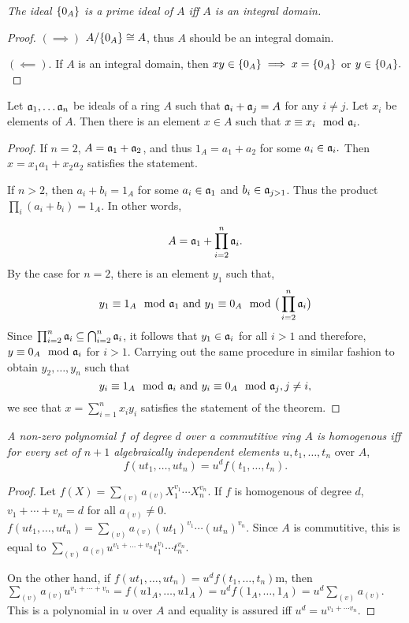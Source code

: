 \noindent \textit{The ideal $\{0_A\}$ is a prime ideal of $A$ iff $A$ is an integral domain.}
\begin{proof}
    $(\implies )$ $A/\{0_A\} \cong A$, thus $A$ should be an integral domain.

    $(\impliedby)$. If $A$ is an integral domain, then $xy \in  \{0_A\} \implies x = \{0_A\}$ or $y \in \{0_A\}.$
\end{proof}

\begin{theorem}
    Let $\mathfrak{a}_1, \dots \mathfrak{a}_n$ be ideals of a ring $A$ such that $\mathfrak{a}_i + \mathfrak{a}_j  = A$ for any $i \neq j$.  Let $x_i$ be elements of $A$. Then there is an element $x \in A$ such that $x \equiv x_i \mod \I a_i.$ 
\end{theorem}

\begin{proof}
    If $n = 2$,  $A = \mathfrak{a}_1 + \mathfrak{a}_2$, and thus $1_A = a_1 + a_2$ for some $a_i \in \mathfrak{a}_i.$ Then $x = x_1 a_1 + x_2a_2$ satisfies the statement.

    If $n > 2$, then $a_i + b_i = 1_A$ for some $a_i \in \mathfrak{a}_1$ and $b_i \in \mathfrak{a}_{j > 1}$. Thus the product $\prod_i (a_i + b_i) = 1_A.$ In other words, 

    $$A = \mathfrak{a}_1 + \prod_{i = 2}^n \mathfrak{a}_i.$$
    By the case for $n=2$,  there is an element $y_1$ such that, 
    $$y_1 \equiv 1_A \mod \I a_1 \text{ and } y_1 \equiv 0_A \mod \big(\prod_{i = 2}^n \I a_i\big)$$
    Since $\prod_{i = 2}^n \mathfrak{a}_i \subseteq \bigcap_{i=2}^n \mathfrak{a}_i$, it follows that $y_1 \in \mathfrak{a}_i$ for all $i > 1$ and therefore, $y \equiv 0_A \mod \I a_i$ for $i > 1$. Carrying out the same procedure in similar fashion to obtain $y_2, \dots, y_n$ such that
    $$y_i \equiv 1_A \mod \I a_i \text{ and } y_i \equiv 0_A \mod \I a_j, j \neq i, $$ 
    we see that $x = \sum_{i = 1}^n x_iy_i$ satisfies the statement of the theorem. 
\end{proof}

\noindent \textit{A non-zero polynomial $f$ of degree $d$ over a commutitive ring $A$  is homogenous iff for every set of $n+1$ algebraically independent elements $u, t_1, \dots, t_n$} over $A$, 
$$f(ut_1, \dots, ut_n) = u^df(t_1, \dots, t_n).$$

\begin{proof}
    Let $f(X) = \sum_{(v)}a_{(v)}X_1^{v_1} \cdots X_n^{v_n}.$ If $f$ is homogenous of degree $d$, $v_1 + \cdots + v_n = d$ for all $a_{(v)} \neq 0$. $f(ut_1, \dots, ut_n) = \sum_{(v)} a_{(v)} (ut_1)^{v_1} \cdots (ut_n)^{v_n}$. Since $A$ is commutitive, this is equal to 
    $\sum_{(v)} a_{(v)} u^{v_1 + \dots + v_n}t_1^{v_1} \cdots t_n^{v_n}$.

    On the other hand, if $f(ut_1, \dots, ut_n) = u^df(t_1, \dots, t_n)$m, then $\sum_{(v)} a_{(v)}u^{v_1 + \cdots + v_n}  = f(u1_A, \dots, u1_A) = u^df(1_A, \dots, 1_A) = u^d\sum_{(v)} a_{(v)}.$ This is a polynomial in $u$ over $A$ and equality is assured iff $u^d = u^{v_1 + \cdots v_n}$. 


\end{proof}

